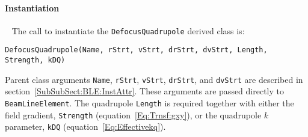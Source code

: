 \paragraph{Instantiation} ~\newline
\noindent
The call to instantiate the \texttt{DefocusQuadrupole} derived class is:
\begin{center}
  \texttt{DefocusQuadrupole(Name, rStrt, vStrt, drStrt, dvStrt, Length,
          Strength, kDQ)} 
\end{center}
Parent class arguments \texttt{Name}, \texttt{rStrt}, \texttt{vStrt},
\texttt{drStrt}, and \texttt{dvStrt} are described in
section~\ref{SubSubSect:BLE:InstAttr}.
These arguments are passed directly to \texttt{BeamLineElement}.
The quadrupole \texttt{Length} is required together with
either the field gradient, \texttt{Strength}
(equation~\ref{Eq:Trnsf:gxy}), or the quadrupole $k$
parameter, \texttt{kDQ} (equation~\ref{Eq:Effectivekq}).

